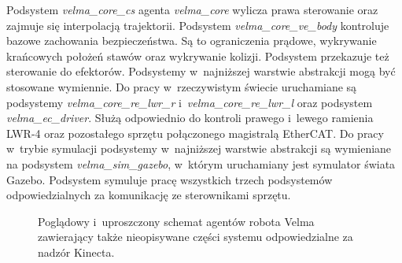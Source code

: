 Podsystem \textit{velma\_core\_cs} agenta \textit{velma\_core} wylicza prawa sterowanie oraz zajmuje się interpolacją trajektorii. Podsystem \textit{velma\_core\_ve\_body} kontroluje bazowe zachowania bezpieczeństwa. Są to ograniczenia prądowe, wykrywanie krańcowych położeń stawów oraz wykrywanie kolizji. Podsystem przekazuje też sterowanie do efektorów. Podsystemy w~najniższej warstwie abstrakcji mogą być stosowane wymiennie. Do pracy w~rzeczywistym świecie uruchamiane są podsystemy \textit{velma\_core\_re\_lwr\_r} i~\textit{velma\_core\_re\_lwr\_l} oraz podsystem \textit{velma\_ec\_driver}. Służą odpowiednio do kontroli prawego i~lewego ramienia LWR-4 oraz pozostałego sprzętu połączonego magistralą EtherCAT. Do pracy w~trybie symulacji podsystemy w~najniższej warstwie abstrakcji są wymieniane na podsystem \textit{velma\_sim\_gazebo}, w~którym uruchamiany jest symulator świata Gazebo. Podsystem symuluje pracę wszystkich trzech podsystemów odpowiedzialnych za komunikację ze sterownikami sprzętu. 

\begin{figure}
	\centering
	\hfill
	
	\caption{Poglądowy i~uproszczony schemat agentów robota Velma zawierający także nieopisywane części systemu odpowiedzialne za nadzór Kinecta\cite{bib:velma2}.}
	\label{fig:agent}
	
\end{figure}


